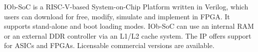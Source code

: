 IOb-SoC is a RISC-V-based System-on-Chip Platform written in Verilog, which
users can download for free, modify, simulate and implement in FPGA. It supports
stand-alone and boot loading modes. IOb-SoC can use an internal RAM or an
external DDR controller via an L1/L2 cache system. The IP offers support for
ASICs and FPGAs. Licensable commercial versions are available.
